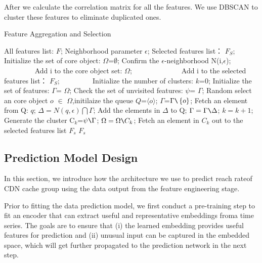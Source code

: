 \documentclass[5p]{elsarticle}
\newcommand{\dabiaolv}{reach rate}
\begin{document}
After we calculate the correlation matrix for all the features. We use DBSCAN to cluster these features to eliminate duplicated ones.

\begin{algorithm}[t]
\caption{Feature Aggregation and Selection} 
\begin{algorithmic}[1]
\Require  
    All features list: $F$;
    Neighborhood parameter $\epsilon$; 
\Ensure  
    Selected features list： $F_S$;  
\State Initialize the set of core object:  $\Omega$=$\emptyset$;
    \State Confirm the $\epsilon$-neighborhood\; N(i,$\epsilon$);
　　　　        \State Add i to the core object set: $\Omega$;
　　        \Else
　　　　        \State Add i to the selected features list： $F_S$;
　　　　    \EndIf
\EndFor
\State Initialize the number of clusters:  $k$=0;
\State Initialize the set of features:  $\Gamma$= $\Omega$;
\While{$\Omega\neq\emptyset$}
\State Check the set of unvisited features: $\psi$= $\Gamma$;
    \State Random select an core object $o$ $\in$ $\Omega$,initilaize the queue $Q$=$\langle o \rangle$;
\State $\Gamma$=$\Gamma \verb|\|\left\{o\right\}$;
    \State Fetch an element from Q: $q$;
    \State $\Delta=N(q,\epsilon)\bigcap\Gamma$;
    \State Add the elements in $\Delta$ to Q;
    \State  $\Gamma= \Gamma\verb|\|\Delta$;
\EndWhile
\State $k=k+1$;
\State Generate the cluster C$_k$=$\psi\verb|\|\Gamma$;
\State $\Omega=\Omega\verb|\|C_k$;
\EndWhile
{}
    \State Fetch an element in $C_k$ out to the selected features list $F_s$
\EndFor
\State \Return $F_s$
\end{algorithmic}
\end{algorithm}


\subsection{Prediction Model Design}

In this section, we introduce how the architecture we use to predict \dabiaolv of CDN cache group using the data output from the feature engineering stage. 

Prior to fitting the data prediction model, we first conduct a pre-training step to fit an encoder that can extract useful and representative embeddings froma  time  series.  The  goals  are  to  ensure  that  (i)  the  learned embedding  provides  useful  features  for  prediction  and  (ii) unusual input can be captured in the embedded space, which will get further propagated to the prediction network in the next step.
\end{document}
